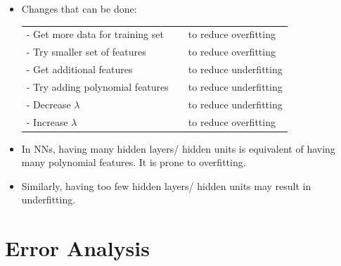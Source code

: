 \documentclass{article}
\begin{document}
\begin{itemize}
	\item Changes that can be done: \\\begin{tabular}{l c l}
	- Get more data for training set &\hspace{50pt} &to reduce overfitting\\
	- Try smaller set of features & &to reduce overfitting\\
	- Get additional features & &to reduce underfitting\\
	- Try adding polynomial features & &to reduce underfitting\\
	- Decrease $\lambda$ & &to reduce underfitting\\
	- Increase $\lambda$ & &to reduce overfitting\\
	\end{tabular}
	\item In NNs, having many hidden layers/ hidden units is equivalent of having many polynomial features. It is prone to overfitting.
	\item Similarly, having too few hidden layers/ hidden units may result in underfitting.
\end{itemize}

\section{Error Analysis}
\end{document}
